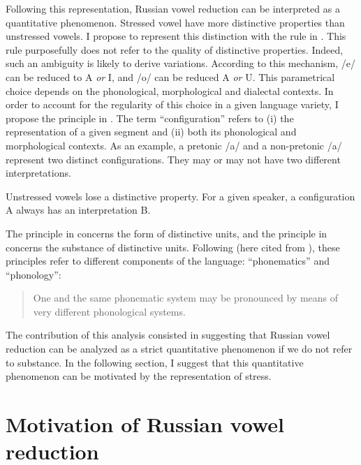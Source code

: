 \documentclass[output=paper,
modfonts,
newtxmath,
hidelinks,
]{langscibook}
\begin{document}
\noindent Following this representation, Russian vowel reduction can be interpreted as a quantitative phenomenon. Stressed vowel have more distinctive properties than unstressed vowels. I propose to represent this distinction with the rule in . This rule purposefully does not refer to the quality of distinctive properties. Indeed, such an ambiguity is likely to derive variations. According to this mechanism, /e/ can be reduced to {\textbar}A{\textbar} \textit{or} {\textbar}I{\textbar}, and /o/ can be reduced {\textbar}A{\textbar} \textit{or} {\textbar}U{\textbar}. This parametrical choice depends on the phonological, morphological and dialectal contexts. In order to account for the regularity of this choice in a given language variety, I propose the principle in . The term “configuration” refers to (i) the representation of a given segment and (ii) both its phonological and morphological contexts. As an example, a pretonic /a/ and a non-pretonic /a/ represent two distinct configurations. They may or may not have two different interpretations.

\label{5:21}
\ea Unstressed vowels lose a distinctive property.\label{5:21a}
\ex For a given speaker, a configuration A always has an interpretation B.\label{5:21b}
\z\z

\noindent The principle in  concerns the form of distinctive units, and the principle in  concerns the substance of distinctive units. Following \citet{Hjelmslev1936} (here cited from \citealt{Hjelmslev1973}), these principles refer to different components of the language: “phonematics” and “phonology”:

\begin{quotation}
One and the same phonematic system may be pronounced by means of very different phonological systems. \citep[159]{Hjelmslev1973}
\end{quotation}

The contribution of this analysis consisted in suggesting that Russian vowel reduction can be analyzed as a strict quantitative phenomenon if we do not refer to substance. In the following section, I suggest that this quantitative phenomenon can be motivated by the representation of stress.

\section{Motivation of Russian vowel reduction}\label{5:s4}
\end{document}
